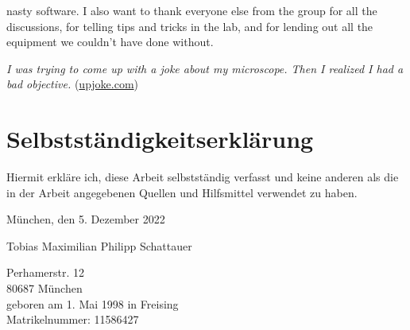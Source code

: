 \begin{minipage}{\textwidth}
nasty software. I also want to thank everyone else from the group for all the discussions, for telling tips and tricks in the lab, and for lending out all the equipment we couldn't have done without.

\begin{center}
    \small
    \textit{I was trying to come up with a joke about my microscope. Then I realized I had a bad objective.} (\href{https://upjoke.com/microscope-jokes}{upjoke.com})
\end{center}
\end{minipage}




\chapter*{Selbstständigkeitserklärung}
Hiermit erkläre ich, diese Arbeit selbstständig verfasst und keine anderen als die in der Arbeit angegebenen Quellen und Hilfsmittel verwendet zu haben.

\vspace{5cm}
München, den 5. Dezember 2022

\vspace{3cm}
Tobias Maximilian Philipp Schattauer

\ifprintversion
Perhamerstr. 12 \\
80687 München \\
geboren am 1. Mai 1998 in Freising \\
Matrikelnummer: 11586427
\fi